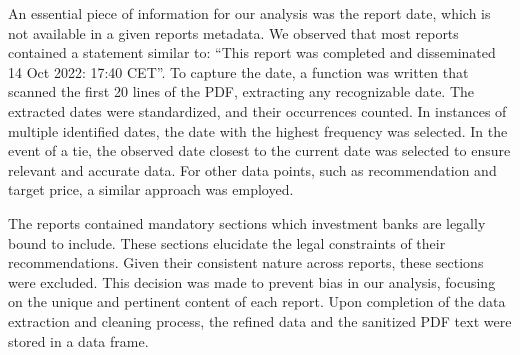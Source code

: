 An essential piece of information for our analysis was the report date, which is not available in a given reports metadata. We observed that most reports contained a statement similar to: “This report was completed and disseminated 14 Oct 2022: 17:40 CET”. To capture the date, a function was written that scanned the first 20 lines of the PDF, extracting any recognizable date. The extracted dates were standardized, and their occurrences counted. In instances of multiple identified dates, the date with the highest frequency was selected. In the event of a tie, the observed date closest to the current date was selected to ensure relevant and accurate data. For other data points, such as recommendation and target price, a similar approach was employed. 

The reports contained mandatory sections which investment banks are legally bound to include. These sections elucidate the legal constraints of their recommendations. Given their consistent nature across reports, these sections were excluded. This decision was made to prevent bias in our analysis, focusing on the unique and pertinent content of each report. Upon completion of the data extraction and cleaning process, the refined data and the sanitized PDF text were stored in a data frame. %

